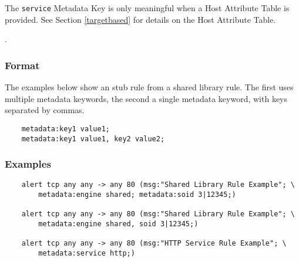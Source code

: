 \documentclass[english]{report}
\newenvironment{note}{
\samepage
    \vspace{10pt}{\textsf{
        {\hspace{7pt}\Huge{$\triangle$\hspace{-12.5pt}{\Large{$^!$}}}}\hspace{5pt}
        {\Large{NOTE}}
    }
    }
   \begin{center}
    \par\vspace{-17pt}

    \begin{lrbox}{\savepar}
    \begin{minipage}[r]{6in}
}
{
    \end{minipage}
    \end{lrbox}
    \fbox{
        \usebox{
            \savepar
	}
    }
    \par\vskip10pt
    \end{center}
}
\newenvironment{note}{
        \begin{rawhtml}
        <p><table border="1"><tr><td><b>
        Note:&nbsp;&nbsp;</b>
        \end{rawhtml}
}{
        \begin{rawhtml}
        </b></td></tr></table></p>
        \end{rawhtml}
}
\begin{document}
\begin{note}

The \texttt{service} Metadata Key is only meaningful when a Host Attribute
Table is provided. See Section \ref{targetbased} for details on the Host Attribute Table.

\end{note}.

\subsubsection{Format}

The examples below show an stub rule from a shared library rule.  The first
uses multiple metadata keywords, the second a single metadata keyword, with
keys separated by commas.

\begin{verbatim}
    metadata:key1 value1;
    metadata:key1 value1, key2 value2;
\end{verbatim}

\subsubsection{Examples}

\begin{verbatim}
    alert tcp any any -> any 80 (msg:"Shared Library Rule Example"; \
        metadata:engine shared; metadata:soid 3|12345;)

    alert tcp any any -> any 80 (msg:"Shared Library Rule Example"; \
        metadata:engine shared, soid 3|12345;)

    alert tcp any any -> any 80 (msg:"HTTP Service Rule Example"; \
        metadata:service http;)
\end{verbatim}
\end{document}

